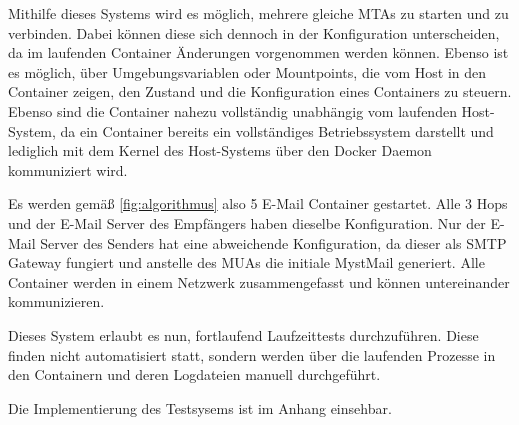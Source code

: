 Mithilfe dieses Systems wird es möglich, mehrere gleiche MTAs zu starten und zu verbinden. Dabei können diese sich dennoch in der Konfiguration unterscheiden, da im laufenden Container Änderungen vorgenommen werden können. Ebenso ist es möglich, über Umgebungsvariablen oder Mountpoints, die vom Host in den Container zeigen, den Zustand und die Konfiguration eines Containers zu steuern. Ebenso sind die Container nahezu vollständig unabhängig vom laufenden Host-System, da ein Container bereits ein vollständiges Betriebssystem darstellt und lediglich mit dem Kernel des Host-Systems über den Docker Daemon kommuniziert wird.

Es werden gemäß \autoref{fig:algorithmus} also 5 E-Mail Container gestartet. Alle 3 Hops und der E-Mail Server des Empfängers haben dieselbe Konfiguration. Nur der E-Mail Server des Senders hat eine abweichende Konfiguration, da dieser als SMTP Gateway fungiert und anstelle des MUAs die initiale MystMail generiert. Alle Container werden in einem Netzwerk zusammengefasst und können untereinander kommunizieren.

Dieses System erlaubt es nun, fortlaufend Laufzeittests durchzuführen. Diese finden nicht automatisiert statt, sondern werden über die laufenden Prozesse in den Containern und deren Logdateien manuell durchgeführt.

Die Implementierung des Testsysems ist im Anhang einsehbar.
